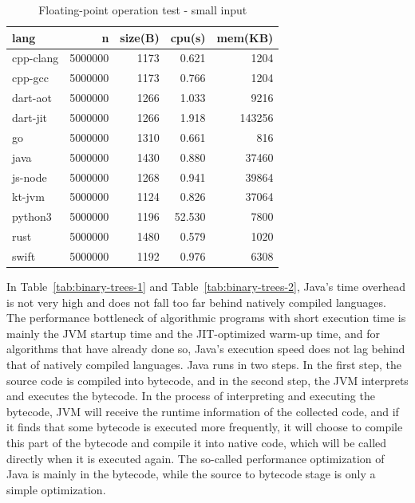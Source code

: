 \begin{table}[htbp]
    \caption{Floating-point operation test - small input}
    \label{tab:n-body-2}
    \begin{center}
        \begin{tabular}{lrrrr}
            \toprule
            lang      & n       & size(B) & cpu(s) & mem(KB) \\
            \midrule
            cpp-clang & 5000000 & 1173    & 0.621  & 1204    \\
            cpp-gcc   & 5000000 & 1173    & 0.766  & 1204    \\
            dart-aot  & 5000000 & 1266    & 1.033  & 9216    \\
            dart-jit  & 5000000 & 1266    & 1.918  & 143256  \\
            go        & 5000000 & 1310    & 0.661  & 816     \\
            java      & 5000000 & 1430    & 0.880  & 37460   \\
            js-node   & 5000000 & 1268    & 0.941  & 39864   \\
            kt-jvm    & 5000000 & 1124    & 0.826  & 37064   \\
            python3   & 5000000 & 1196    & 52.530 & 7800    \\
            rust      & 5000000 & 1480    & 0.579  & 1020    \\
            swift     & 5000000 & 1192    & 0.976  & 6308    \\
            \bottomrule
        \end{tabular}
    \end{center}
\end{table}

In Table~\ref{tab:binary-trees-1} and Table~\ref{tab:binary-trees-2},
Java's time overhead is not very high and does not fall too far behind natively compiled languages. The performance bottleneck of algorithmic programs with short execution time is mainly the JVM startup time and the JIT-optimized warm-up time, and for algorithms that have already done so, Java's execution speed does not lag behind that of natively compiled languages. Java runs in two steps. In the first step, the source code is compiled into bytecode, and in the second step, the JVM interprets and executes the bytecode. In the process of interpreting and executing the bytecode, JVM will receive the runtime information of the collected code, and if it finds that some bytecode is executed more frequently, it will choose to compile this part of the bytecode and compile it into native code, which will be called directly when it is executed again. The so-called performance optimization of Java is mainly in the bytecode, while the source to bytecode stage is only a simple optimization.

